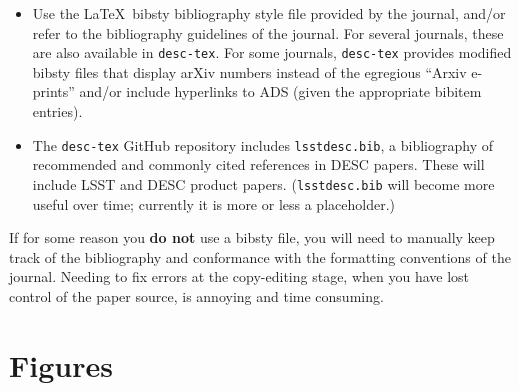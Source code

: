 \documentclass[letterpaper,11pt]{article}
\begin{document}
\begin{itemize}

\item
Use the La\TeX~bibsty bibliography style file provided by the journal, and/or refer to the bibliography guidelines of the journal.  For several journals, these are also available in {\tt desc-tex}.  For some journals,  {\tt desc-tex} provides  modified bibsty files that display arXiv numbers instead of the egregious ``Arxiv e-prints'' and/or include hyperlinks to ADS (given the appropriate bibitem entries).

\item
The   {\tt desc-tex} GitHub repository includes {\tt lsstdesc.bib}, a bibliography of recommended and commonly cited references in DESC papers.  These will include LSST and DESC product papers.  ({\tt lsstdesc.bib} will become more useful over time; currently it is more or less a placeholder.)

\end{itemize}

If for some reason you {\bf do not} use a bibsty file, you will need to manually keep track of the bibliography and conformance with the formatting conventions of the journal.  Needing to fix errors at the copy-editing stage, when you have lost control of the paper source, is annoying and time consuming.

%

\section{Figures}
\end{document}
